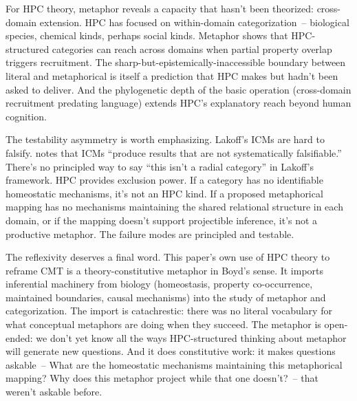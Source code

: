 \documentclass[12pt]{article}
\begin{document}
For HPC theory, metaphor reveals a capacity that hasn't been theorized: cross-domain extension. HPC has focused on within-domain categorization~-- biological species, chemical kinds, perhaps social kinds. Metaphor shows that HPC-structured categories can reach across domains when partial property overlap triggers recruitment. The sharp-but-epistemically-inaccessible boundary between literal and metaphorical is itself a prediction that HPC makes but hadn't been asked to deliver. And the phylogenetic depth of the basic operation (cross-domain recruitment predating language) extends HPC's explanatory reach beyond human cognition.

The testability asymmetry is worth emphasizing. Lakoff's ICMs are hard to falsify. \textcite{glynn2010} notes that ICMs \enquote{produce results that are not systematically falsifiable.} There's no principled way to say \enquote{this isn't a radial category} in Lakoff's framework. HPC provides exclusion power. If a category has no identifiable homeostatic mechanisms, it's not an HPC kind. If a proposed metaphorical mapping has no mechanisms maintaining the shared relational structure in each domain, or if the mapping doesn't support projectible inference, it's not a productive metaphor. The failure modes are principled and testable.

The reflexivity deserves a final word. This paper's own use of HPC theory to reframe CMT is a theory-constitutive metaphor in Boyd's sense. It imports inferential machinery from biology (homeostasis, property co-occurrence, maintained boundaries, causal mechanisms) into the study of metaphor and categorization. The import is catachrestic: there was no literal vocabulary for what conceptual metaphors are doing when they succeed. The metaphor is open-ended: we don't yet know all the ways HPC-structured thinking about metaphor will generate new questions. And it does constitutive work: it makes questions askable~-- What are the homeostatic mechanisms maintaining this metaphorical mapping? Why does this metaphor project while that one doesn't?~-- that weren't askable before.
\end{document}
